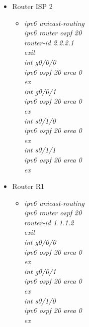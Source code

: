 \documentclass[a4paper, 12pt]{article}
\begin{document}
\begin{itemize}
\begin{itemize}
\begin{itemize}
        \end{itemize}
        \item Router ISP 2
        \begin{itemize}
         \item \textit{ipv6 unicast-routing\\
                        ipv6 router ospf 20\\
                        router-id 2.2.2.1\\
                        exit\\
                        int g0/0/0\\
                        ipv6 ospf 20 area 0\\
                        ex\\
                        int g0/0/1\\
                        ipv6 ospf 20 area 0\\
                        ex\\
                        int s0/1/0\\
                        ipv6 ospf 20 area 0\\
                        ex\\
                        int s0/1/1\\
                        ipv6 ospf 20 area 0\\
                        ex\\}
        
          \end{itemize}
            \item Router R1
           
        \begin{itemize}
         \item \textit{ipv6 unicast-routing\\
                        ipv6 router ospf 20\\
                        router-id 1.1.1.2\\
                        exit\\
                        int g0/0/0\\
                        ipv6 ospf 20 area 0\\
                        ex\\
                        int g0/0/1\\
                        ipv6 ospf 20 area 0\\
                        ex\\
                        int s0/1/0\\
                        ipv6 ospf 20 area 0\\
                        ex\\}
        

\end{itemize}
\end{itemize}
\end{itemize}
\end{document}
